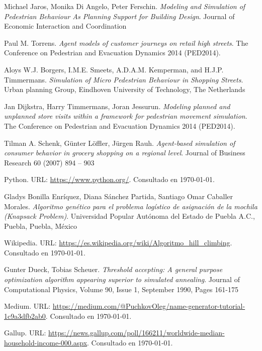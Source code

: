 \documentclass[12pt]{amsart}
\begin{document}
\begin{thebibliography}{99}
	 Michael Jaros, Monika Di Angelo, Peter Ferschin. \emph{Modeling and Simulation of Pedestrian Behaviour As Planning Support for Building Design}.
		Journal of Economic Interaction and Coordination

	 Paul M. Torrens. \emph{Agent models of customer journeys on retail high streets}.
		The Conference on Pedestrian and Evacuation Dynamics 2014 (PED2014).

	 Aloys W.J. Borgers, I.M.E. Smeets, A.D.A.M. Kemperman, and H.J.P. Timmermans. \emph{Simulation of Micro Pedestrian Behaviour in
Shopping Streets}.
		Urban planning Group, Eindhoven University of Technology, The Netherlands

	 Jan Dijkstra, Harry Timmermans, Joran Jessurun. \emph{Modeling planned and unplanned store visits within a framework
for pedestrian movement simulation}.
		The Conference on Pedestrian and Evacuation Dynamics 2014 (PED2014).

Tilman A. Schenk, Günter Löffler, Jürgen Rauh. \emph{Agent-based simulation of consumer behavior in grocery shopping
on a regional level}.
		Journal of Business Research 60 (2007) 894 – 903

 Python. 
	URL: \href{https://www.python.org/}
	  {https://www.python.org/}.
		Consultado en \today.

Gladys Bonilla Enríquez, Diana Sánchez Partida, Santiago Omar Caballer Morales. \emph{Algoritmo genético para el problema logístico de
asignación de la mochila (Knapsack Problem)}.
		Universidad Popular Autónoma del Estado de Puebla A.C., Puebla, Puebla, México

 Wikipedia. 
	URL: \href{https://es.wikipedia.org/wiki/Algoritmo\_hill\_climbing}
	  {https://es.wikipedia.org/wiki/Algoritmo\_hill\_climbing}.
		Consultado en \today.

Gunter Dueck, Tobias Scheuer. \emph{Threshold accepting: A general purpose optimization algorithm appearing superior to simulated annealing}.
		Journal of Computational Physics, Volume 90, Issue 1, September 1990, Pages 161-175

 Medium. 
	URL: \href{https://medium.com/@PuchkovOleg/name-generator-tutorial-1c9a3dfb2ab0}
	  {https://medium.com/@PuchkovOleg/name-generator-tutorial-1c9a3dfb2ab0}.
		Consultado en \today.

 Gallup. 
	URL: \href{https://news.gallup.com/poll/166211/worldwide-median-household-income-000.aspx}
	  {https://news.gallup.com/poll/166211/worldwide-median-household-income-000.aspx}.
		Consultado en \today.


\end{thebibliography}
\end{document}
